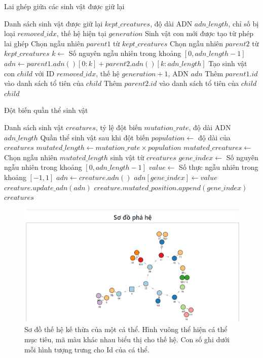 \begin{algorithm}
	\caption{Lai ghép giữa các sinh vật được giữ lại}
	\begin{algorithmic}[1]
		\Require Danh sách sinh vật được giữ lại $kept\_creatures$, độ dài ADN $adn\_length$, chỉ số bị loại $removed\_idx$, thế hệ hiện tại $generation$
		\Ensure Sinh vật con mới được tạo từ phép lai ghép
		\State Chọn ngẫu nhiên $parent1$ từ $kept\_creatures$
		\State Chọn ngẫu nhiên $parent2$ từ $kept\_creatures$
		\State $k \gets$ Số nguyên ngẫu nhiên trong khoảng $[0, adn\_length - 1]$
		\State $adn \gets parent1.adn()[0:k] + parent2.adn()[k:adn\_length]$
		\State Tạo sinh vật con $child$ với ID $removed\_idx$, thế hệ $generation + 1$, ADN $adn$
		\State Thêm $parent1.id$ vào danh sách tổ tiên của $child$
		\State Thêm $parent2.id$ vào danh sách tổ tiên của $child$
		\State \Return $child$
	\end{algorithmic}
\end{algorithm}

\begin{algorithm}
	\caption{Đột biến quần thể sinh vật}
	\begin{algorithmic}[1]
		\Require Danh sách sinh vật $creatures$, tỷ lệ đột biến $mutation\_rate$, độ dài ADN $adn\_length$
		\Ensure Quần thể sinh vật sau khi đột biến
		\State $population \gets$ độ dài của $creatures$
		\State $mutated\_length \gets mutation\_rate \times population$
		\State $mutated\_creatures \gets$ Chọn ngẫu nhiên $mutated\_length$ sinh vật từ $creatures$
		\State $gene\_index \gets$ Số nguyên ngẫu nhiên trong khoảng $[0, adn\_length - 1]$
		\State $value \gets$ Số thực ngẫu nhiên trong khoảng $[-1, 1]$
		\State $adn \gets creature.adn()$
		\State $adn[gene\_index] \gets value$
		\State $creature.update\_adn(adn)$
		\State $creature.mutated\_position.append(gene\_index)$
		\EndFor
		\State \Return $creatures$
	\end{algorithmic}
\end{algorithm}

\begin{figure}[h]
	\centering
	\includegraphics[scale=0.5]{figures/creature_relationship.png}
	\caption{Sơ đồ thế hệ kế thừa của một cá thể. Hình vuông thể hiện cá thể mục tiêu, mã màu khác nhau biểu thị cho thế hệ. Con số ghi dưới mỗi hình tượng trưng cho Id của cá thể.}
\end{figure}
